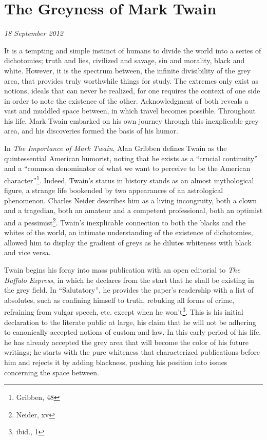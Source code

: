 \section{The Greyness of Mark Twain}

\textit{18 September 2012}

It is a tempting and simple instinct of humans to divide the world into a series
of dichotomies; truth and lies, civilized and savage, sin and morality, black
and white. However, it is the spectrum between, the infinite divisibility of the
grey area, that provides truly worthwhile things for study. The extremes only
exist as notions, ideals that can never be realized, for one requires the
context of one side in order to note the existence of the other. Acknowledgment
of both reveals a vast and muddled space between, in which travel becomes
possible. Throughout his life, Mark Twain embarked on his own journey through
this inexplicable grey area, and his discoveries formed the basis of his humor.

In \textit{The Importance of Mark Twain}, Alan Gribben defines Twain as the
quintessential American humorist, noting that he exists as a ``crucial
continuity'' and a ``common denominator of what we want to perceive to be the
American character''\footnote{Gribben, 48}. Indeed, Twain's status in history
stands as an almost mythological figure, a strange life bookended by two
appearances of an astrological phenomenon. Charles Neider describes him as a
living incongruity, both a clown and a tragedian, both an amateur and a
competent professional, both an optimist and a pessimist\footnote{Neider, xv}.
Twain's inexplicable connection to both the blacks and the whites of the world,
an intimate understanding of the existence of dichotomies, allowed him to
display the gradient of greys as he dilutes whiteness with black and vice versa.

Twain begins his foray into mass publication with an open editorial to
\textit{The Buffalo Express}, in which he declares from the start that he shall
be existing in the grey field. In ``Salutatory'', he provides the paper's
readership with a list of absolutes, such as confining himself to truth,
rebuking all forms of crime, refraining from vulgar speech, etc. except when he
won't\footnote{ibid., 1}. This is his initial declaration to the literate public
at large, his claim that he will not be adhering to canonically accepted notions
of custom and  law. In this early period of his life, he has already accepted
the grey area that will become the color of his future writings; he starts with
the pure whiteness that characterized publications before him and rejects it by
adding blackness, pushing his position into issues concerning the space between.

